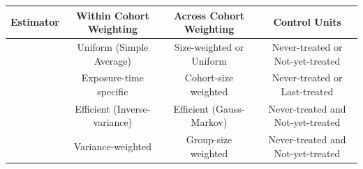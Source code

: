\begin{table}[h]
\centering
\small
\begin{tabular}{|c|c|c|c|}
\hline
\textbf{Estimator} & \textbf{Within Cohort Weighting} & \textbf{Across Cohort Weighting} & \textbf{Control Units} \\ \hline
\cite{callaway2021difference} & Uniform (Simple Average) & Size-weighted or Uniform & Never-treated or Not-yet-treated \\ \hline
\cite{sun2021estimating} & Exposure-time specific & Cohort-size weighted & Never-treated or Last-treated \\ \hline
\cite{borusyak2024revisiting} & Efficient (Inverse-variance) & Efficient (Gauss-Markov) & Never-treated and Not-yet-treated \\ \hline
\cite{gardner2022two} & Variance-weighted & Group-size weighted & Never-treated and Not-yet-treated \\ \hline
\end{tabular}
\end{table}
